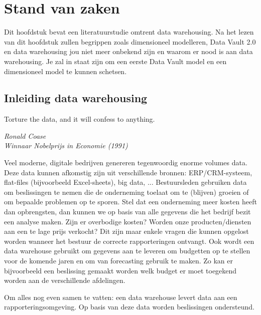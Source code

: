 \chapter{Stand van zaken}
\label{ch:stand-van-zaken}



Dit hoofdstuk bevat een literatuurstudie omtrent data warehousing. Na het lezen van dit hoofdstuk zullen begrippen zoals dimensioneel modelleren, Data Vault 2.0 en data warehousing jou niet meer onbekend zijn en waarom er nood is aan data warehousing. Je zal in staat zijn om een eerste Data Vault model en een dimensioneel model te kunnen schetsen.

\section{Inleiding data warehousing}

\epigraph{Torture the data, and it will confess to anything. }{\textit{Ronald Coase \\ Winnaar Nobelprijs in Economie (1991)}}

Veel moderne, digitale bedrijven genereren tegenwoordig enorme volumes data. Deze data kunnen afkomstig zijn uit verschillende bronnen: ERP/CRM-systeem, flat-files (bijvoorbeeld Excel-sheets), big data, ... Bestuursleden gebruiken data om beslissingen te nemen die de onderneming toelaat om te (blijven) groeien of om bepaalde problemen op te sporen. Stel dat een onderneming meer kosten heeft dan opbrengsten, dan kunnen we op basis van alle gegevens die het bedrijf bezit een analyse maken. Zijn er overbodige kosten? Worden onze producten/diensten aan een te lage prijs verkocht? Dit zijn maar enkele vragen die kunnen opgelost worden wanneer het bestuur de correcte rapporteringen ontvangt. Ook wordt een data warehouse gebruikt om gegevens aan te leveren om budgetten op te stellen voor de komende jaren en om van forecasting gebruik te maken. Zo kan er bijvoorbeeld een beslissing gemaakt worden welk budget er moet toegekend worden aan de verschillende afdelingen. 

Om alles nog even samen te vatten: een data warehouse levert data aan een rapporteringsomgeving. Op basis van deze data worden beslissingen ondersteund.

